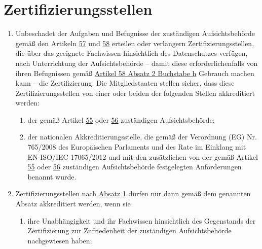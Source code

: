 \chapter{Zertifizierungsstellen}
\label{ch:43}


\begin{enumerate}

  \item Unbeschadet der Aufgaben und Befugnisse der zuständigen Aufsichtsbehörde gemäß den Artikeln \hyperref[ch:57]
   {57} und \hyperref[ch:58]{58} erteilen oder verlängern Zertifizierungsstellen, die über das geeignete Fachwissen
   hinsichtlich des Datenschutzes verfügen, nach Unterrichtung der Aufsichtsbehörde -- damit diese erforderlichenfalls
   von ihren Befugnissen gemäß \hyperref[itm:58-2h]{Artikel 58 Absatz 2 Buchstabe h} Gebrauch machen kann -- die
   Zertifizierung. Die Mitgliedstaaten stellen sicher, dass diese Zertifizierungsstellen von einer oder beiden der
   folgenden Stellen akkreditiert werden:
  \label{itm:43-1}

  \begin{enumerate}
  
    \item der gemäß Artikel \hyperref[ch:55]{55} oder \hyperref[ch:56]{56} zuständigen Aufsichtsbehörde;
    \label{itm:43-1a}

    \item der nationalen Akkreditierungsstelle, die gemäß der Verordnung (EG) Nr. 765/2008 des Europäischen Parlaments
     und des Rate im Einklang mit EN-ISO/IEC 17065/2012 und mit den zusätzlichen von der gemäß
     Artikel \hyperref[ch:55]{55} oder \hyperref[ch:56]{56} zuständigen Aufsichtsbehörde festgelegten Anforderungen
     benannt wurde.
    \label{itm:43-1b}

  \end{enumerate}

  \item Zertifizierungsstellen nach \hyperref[itm:43-1]{Absatz 1} dürfen nur dann gemäß dem genannten Absatz
  akkreditiert werden, wenn sie
  \label{itm:43-2}

  \begin{enumerate}
  
    \item ihre Unabhängigkeit und ihr Fachwissen hinsichtlich des Gegenstands der Zertifizierung zur Zufriedenheit der
     zuständigen Aufsichtsbehörde nachgewiesen haben;
    \label{itm:43-2a}


\end{enumerate}
\end{enumerate}
